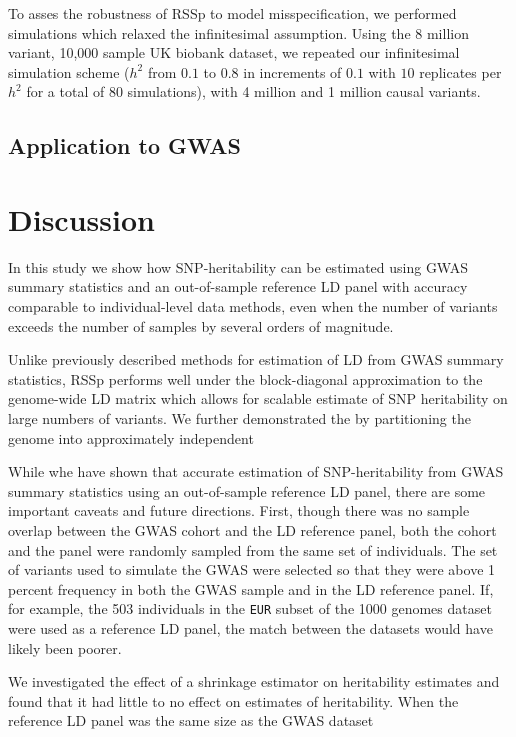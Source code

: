 To asses the robustness of RSSp to model misspecification, we performed simulations which relaxed the infinitesimal assumption.  Using the 8 million variant, 10,000 sample UK biobank dataset, we repeated our infinitesimal simulation scheme ($h^2$ from $0.1$ to $0.8$ in increments of $0.1$ with $10$ replicates per $h^2$ for a total of 80 simulations), with 4 million and 1 million causal variants.  


\subsection{Application to GWAS}


\section{Discussion}\label{sec:orge95691e}


In this study we show how SNP-heritability can be estimated using GWAS summary statistics and an out-of-sample reference LD panel with accuracy comparable to individual-level data methods, even when the number of variants exceeds the number of samples by several orders of magnitude.

Unlike previously described methods for estimation of LD from GWAS summary statistics, RSSp performs well under the block-diagonal approximation to the genome-wide LD matrix which allows for scalable estimate of SNP heritability on large numbers of variants. We further demonstrated the by partitioning the genome into approximately independent

While whe have shown that accurate estimation of SNP-heritability from GWAS summary statistics using an out-of-sample reference LD panel, there are some important caveats and future directions.  First, though there was no sample overlap between the GWAS cohort and the LD reference panel, both the cohort and the panel were randomly sampled from the same set of individuals.  The set of
variants used to simulate the GWAS were selected so that they were above 1 percent frequency in both the GWAS sample and in the LD reference panel.  If, for example, the 503 individuals in the \texttt{EUR} subset of the 1000 genomes dataset were used as a reference LD panel, the match between the datasets would have likely been poorer.

We investigated the effect of a shrinkage estimator on heritability estimates and found that it had little to no effect on estimates of heritability.  When the reference LD panel was the same size as the GWAS dataset

